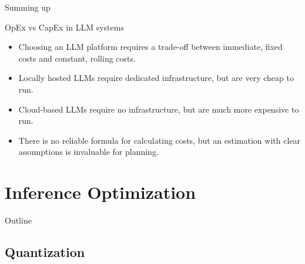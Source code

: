 \documentclass[24pt]{beamer}
\newcommand{\sectionslide}{
	\begin{frame}{Outline}
		\tableofcontents[currentsection]
\end{frame}
}
\newcommand{\subsectionslide}{
	 \begin{frame}
		\sectionpage
		\subsectionpage
	\end{frame}
}
\begin{document}
\begin{frame}{Summing up}
	\begin{block}{OpEx vs CapEx in LLM systems}
		\begin{itemize}
			\item Choosing an LLM platform requires a trade-off between immediate, fixed costs and constant, rolling costs.
			\item Locally hosted LLMs require dedicated infrastructure, but are very cheap to run.
			\item Cloud-based LLMs require no infrastructure, but are much more expensive to run.
			\item There is no reliable formula for calculating costs, but an estimation with clear assumptions is invaluable for planning.
		\end{itemize}
	\end{block}
\end{frame}


\section{Inference Optimization}
\sectionslide

\subsection{Quantization}
\subsectionslide
\end{document}
